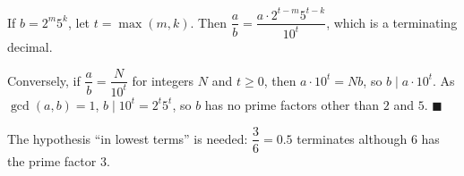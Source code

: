 If $b=2^m5^k$, let $t=\max(m,k)$. Then $\dfrac ab=\dfrac{a\cdot2^{t-m}5^{t-k}}{10^t}$, which is a terminating decimal.

Conversely, if $\dfrac ab=\dfrac N{10^t}$ for integers $N$ and $t\ge0$, then $a\cdot10^t=Nb$, so $b\mid a\cdot10^t$. As $\gcd(a,b)=1$, $b\mid10^t=2^t5^t$, so $b$ has no prime factors other than $2$ and $5$. $\blacksquare$

The hypothesis ``in lowest terms'' is needed: $\dfrac36=0.5$ terminates although $6$ has the prime factor $3$.
